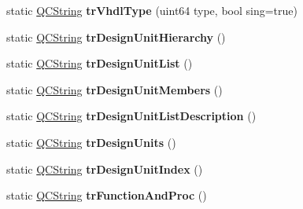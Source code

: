\begin{DoxyCompactItemize}
\item 
\hypertarget{class_vhdl_doc_gen_a479664f0ea6788dba432a03d2bb70fac}{static \hyperlink{class_q_c_string}{Q\-C\-String} {\bfseries tr\-Vhdl\-Type} (uint64 type, bool sing=true)}\label{class_vhdl_doc_gen_a479664f0ea6788dba432a03d2bb70fac}

\item 
\hypertarget{class_vhdl_doc_gen_afc0858275b47da9ca084f52cb3ac2ead}{static \hyperlink{class_q_c_string}{Q\-C\-String} {\bfseries tr\-Design\-Unit\-Hierarchy} ()}\label{class_vhdl_doc_gen_afc0858275b47da9ca084f52cb3ac2ead}

\item 
\hypertarget{class_vhdl_doc_gen_aa6a3664d6372879996896226b4fb1b41}{static \hyperlink{class_q_c_string}{Q\-C\-String} {\bfseries tr\-Design\-Unit\-List} ()}\label{class_vhdl_doc_gen_aa6a3664d6372879996896226b4fb1b41}

\item 
\hypertarget{class_vhdl_doc_gen_a8706cf236f1d9cfb4f738c3db99d1e72}{static \hyperlink{class_q_c_string}{Q\-C\-String} {\bfseries tr\-Design\-Unit\-Members} ()}\label{class_vhdl_doc_gen_a8706cf236f1d9cfb4f738c3db99d1e72}

\item 
\hypertarget{class_vhdl_doc_gen_a863dc5d2fc139809a9f1925507862c09}{static \hyperlink{class_q_c_string}{Q\-C\-String} {\bfseries tr\-Design\-Unit\-List\-Description} ()}\label{class_vhdl_doc_gen_a863dc5d2fc139809a9f1925507862c09}

\item 
\hypertarget{class_vhdl_doc_gen_ad6a30bd201633ef4974f4bde7654093d}{static \hyperlink{class_q_c_string}{Q\-C\-String} {\bfseries tr\-Design\-Units} ()}\label{class_vhdl_doc_gen_ad6a30bd201633ef4974f4bde7654093d}

\item 
\hypertarget{class_vhdl_doc_gen_a8aef5d261650a9efb15abf22669a5b9f}{static \hyperlink{class_q_c_string}{Q\-C\-String} {\bfseries tr\-Design\-Unit\-Index} ()}\label{class_vhdl_doc_gen_a8aef5d261650a9efb15abf22669a5b9f}

\item 
\hypertarget{class_vhdl_doc_gen_a8257be9159090f6bf649bb54ca0c0d4b}{static \hyperlink{class_q_c_string}{Q\-C\-String} {\bfseries tr\-Function\-And\-Proc} ()}\label{class_vhdl_doc_gen_a8257be9159090f6bf649bb54ca0c0d4b}


\end{DoxyCompactItemize}
